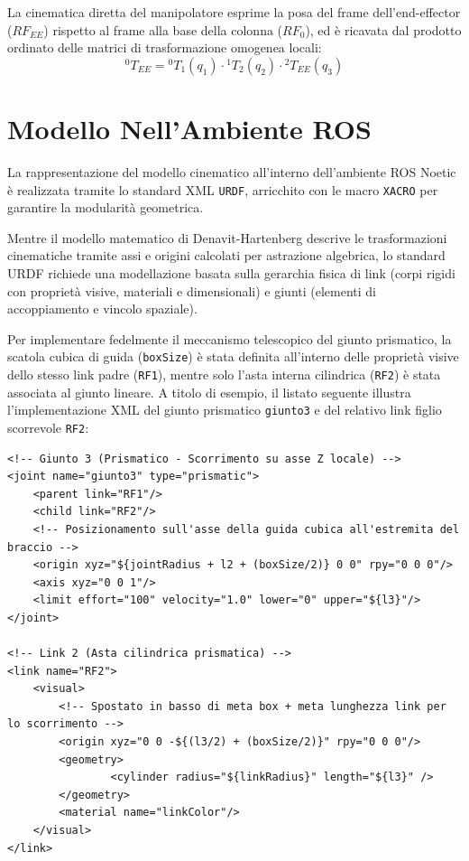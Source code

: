 \documentclass[11pt, a4paper]{report}
\begin{document}
La cinematica diretta del manipolatore esprime la posa del frame dell'end-effector (\(RF_{EE}\)) rispetto al frame alla base della colonna (\(RF_0\)), ed è ricavata dal prodotto ordinato delle matrici di trasformazione omogenea locali:
\[
    ^{0}T_{EE} = {^{0}T_1}(q_1) \cdot {^{1}T_2}(q_2) \cdot {^{2}T_{EE}}(q_3)
\]


\section{Modello Nell'Ambiente ROS}
\label{sec:implementazione_ros}

La rappresentazione del modello cinematico all'interno dell'ambiente ROS Noetic è realizzata tramite lo standard XML \texttt{URDF}, arricchito con le macro \texttt{XACRO} per garantire la modularità geometrica.

Mentre il modello matematico di Denavit-Hartenberg descrive le trasformazioni cinematiche tramite assi e origini calcolati per astrazione algebrica, lo standard URDF richiede una modellazione basata sulla gerarchia fisica di link (corpi rigidi con proprietà visive, materiali e dimensionali) e giunti (elementi di accoppiamento e vincolo spaziale).

Per implementare fedelmente il meccanismo telescopico del giunto prismatico, la scatola cubica di guida (\texttt{boxSize}) è stata definita all'interno delle proprietà visive dello stesso link padre (\texttt{RF1}), mentre solo l'asta interna cilindrica (\texttt{RF2}) è stata associata al giunto lineare. A titolo di esempio, il listato seguente illustra l'implementazione XML del giunto prismatico \texttt{giunto3} e del relativo link figlio scorrevole \texttt{RF2}:

\begin{lstlisting}[style=XMLStyle]
<!-- Giunto 3 (Prismatico - Scorrimento su asse Z locale) -->
<joint name="giunto3" type="prismatic">
    <parent link="RF1"/>
    <child link="RF2"/>
    <!-- Posizionamento sull'asse della guida cubica all'estremita del braccio -->
    <origin xyz="${jointRadius + l2 + (boxSize/2)} 0 0" rpy="0 0 0"/>
    <axis xyz="0 0 1"/>
    <limit effort="100" velocity="1.0" lower="0" upper="${l3}"/>
</joint>

<!-- Link 2 (Asta cilindrica prismatica) -->
<link name="RF2">
    <visual>
        <!-- Spostato in basso di meta box + meta lunghezza link per lo scorrimento -->
        <origin xyz="0 0 -${(l3/2) + (boxSize/2)}" rpy="0 0 0"/>
        <geometry>
                <cylinder radius="${linkRadius}" length="${l3}" />
        </geometry>
        <material name="linkColor"/>
    </visual>
</link>
\end{lstlisting}
\newpage
\end{document}

